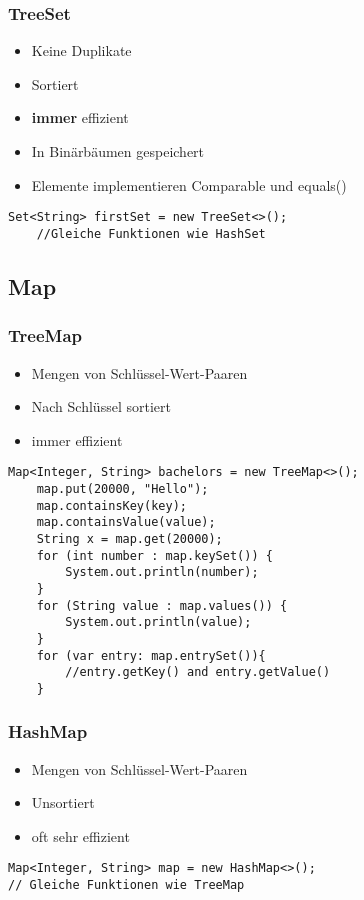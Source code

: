 \begin{multicols*}{5}
		\subsubsection{TreeSet}
		\begin{itemize}
			\item Keine Duplikate
			\item Sortiert
			\item \textbf{immer} effizient
			\item In Binärbäumen gespeichert
			\item Elemente implementieren Comparable und equals()
		\end{itemize}
		\begin{lstlisting}
Set<String> firstSet = new TreeSet<>();
	//Gleiche Funktionen wie HashSet
		\end{lstlisting}
	
	\subsection{Map}
		\subsubsection{TreeMap}
		\begin{itemize}
			\item Mengen von Schlüssel-Wert-Paaren
			\item Nach Schlüssel sortiert
			\item immer effizient
		\end{itemize}
		\begin{lstlisting}
Map<Integer, String> bachelors = new TreeMap<>();
	map.put(20000, "Hello");
	map.containsKey(key);
	map.containsValue(value);
	String x = map.get(20000);
	for (int number : map.keySet()) { 
		System.out.println(number);
	}
	for (String value : map.values()) { 
		System.out.println(value);
	}
	for (var entry: map.entrySet()){
		//entry.getKey() and entry.getValue()
	}
		\end{lstlisting}
		\subsubsection{HashMap}
		\begin{itemize}
			\item Mengen von Schlüssel-Wert-Paaren
			\item Unsortiert
			\item oft sehr effizient
		\end{itemize}
		\begin{lstlisting}
Map<Integer, String> map = new HashMap<>();
// Gleiche Funktionen wie TreeMap
		\end{lstlisting}

\end{multicols*}
